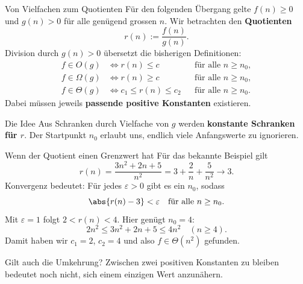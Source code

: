 \begin{frame}{Von Vielfachen zum Quotienten}
	Für den folgenden Übergang gelte $f(n)\geq 0$ und $g(n)>0$ für alle genügend grossen $n$. Wir betrachten den \textbf{Quotienten}
	\[
		r(n):=\frac{f(n)}{g(n)}.
	\]
	Division durch $g(n)>0$ übersetzt die bisherigen Definitionen:
	\begin{align*}
		f\in O(g) &\iff r(n)\leq c &&\text{für alle }n\geq n_0,\\
		f\in\Omega(g) &\iff r(n)\geq c &&\text{für alle }n\geq n_0,\\
		f\in\Theta(g) &\iff c_1\leq r(n)\leq c_2 &&\text{für alle }n\geq n_0.
	\end{align*}
	Dabei müssen jeweils \textbf{passende positive Konstanten} existieren.
	\begin{block}{Die Idee}
		Aus Schranken durch Vielfache von $g$ werden \textbf{konstante Schranken für $r$}. Der Startpunkt $n_0$ erlaubt uns, endlich viele Anfangswerte zu ignorieren.
	\end{block}
\end{frame}

\begin{frame}{Wenn der Quotient einen Grenzwert hat}
	Für das bekannte Beispiel gilt
	\[
		r(n)=\frac{3n^2+2n+5}{n^2}=3+\frac{2}{n}+\frac{5}{n^2}\longrightarrow 3.
	\]
	\pause
	Konvergenz bedeutet: Für jedes $\varepsilon>0$ gibt es ein $n_0$, sodass
	\[
		\abs{r(n)-3}<\varepsilon\quad\text{für alle }n\geq n_0.
	\]
	Mit $\varepsilon=1$ folgt $2<r(n)<4$. Hier genügt $n_0=4$:
	\[
		2n^2\leq 3n^2+2n+5\leq 4n^2\quad(n\geq 4).
	\]
	Damit haben wir $c_1=2$, $c_2=4$ und also $f\in\Theta(n^2)$ gefunden.
	\begin{alertblock}{Gilt auch die Umkehrung?}
		Zwischen zwei positiven Konstanten zu bleiben bedeutet noch nicht, sich einem einzigen Wert anzunähern.
	\end{alertblock}
\end{frame}

